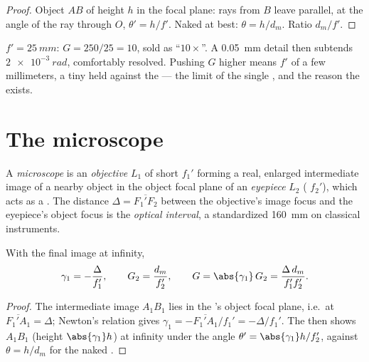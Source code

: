 \begin{proof}
Object $AB$ of height $h$ in the focal plane: rays from $B$ leave
parallel, at the angle of the ray through $O$, $\theta' = h/f'$. Naked
 at best: $\theta = h/d_m$. Ratio $d_m/f'$.
\end{proof}

\begin{example}\label{ex:b1:optical-instruments:loupe}
$f' = \qty{25}{mm}$: $G = 250/25 = 10$, sold as ``$10\times$''. A
\qty{0.05}{mm} detail then subtends $\qty{2e-3}{rad}$, comfortably
resolved. Pushing $G$ higher means $f'$ of a few millimeters, a tiny
 held against the  --- the limit of the single , and the
reason the  exists.
\end{example}

\section{The microscope}

\begin{definition}\label{def:b1:optical-instruments:microscope}
A \emph{microscope} is an \emph{objective} $L_1$ of short 
$f_1'$ forming a real, enlarged intermediate image of a nearby object
in the object focal plane of an \emph{eyepiece} $L_2$ (
$f_2'$), which acts as a . The distance $\Delta =
\overline{F_1'F_2}$ between the objective's image focus and the
eyepiece's object focus is the \emph{optical interval}, a standardized
\qty{160}{mm} on classical instruments.
\end{definition}

\begin{proposition}\label{prop:b1:optical-instruments:microscope}
With the final image at infinity,
\[
\gamma_1 = -\frac{\Delta}{f_1'}, \qquad G_2 = \frac{d_m}{f_2'},
\qquad G = \abs{\gamma_1}\,G_2 = \frac{\Delta\,d_m}{f_1' f_2'} .
\]
\end{proposition}

\begin{proof}
The intermediate image $A_1B_1$ lies in the 's object focal
plane, i.e.\ at $\overline{F_1'A_1} = \Delta$; Newton's relation gives
$\gamma_1 = -\overline{F_1'A_1}/f_1' = -\Delta/f_1'$. The  then
shows $A_1B_1$ (height $\abs{\gamma_1} h$) at infinity under the angle
$\theta' = \abs{\gamma_1} h/f_2'$, against $\theta = h/d_m$ for the
naked .
\end{proof}

